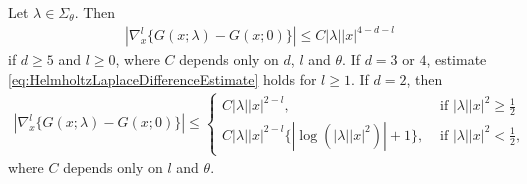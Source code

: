 \begin{lem}
  \label{lem:HelmholtzLaplaceDifference}
  Let $\lambda \in \Sigma_\theta$.
  Then
  \begin{align}
    \label{eq:HelmholtzLaplaceDifferenceEstimate}
    |\nabla_x^l \{ G(x; \lambda) - G(x; 0) \}| \leq C |\lambda| |x|^{4 - d - l}
  \end{align}
  if $d \geq 5$ and $l \geq 0$, where $C$ depends only on $d$, $l$ and $\theta$.
  If $d = 3$ or $4$, estimate \eqref{eq:HelmholtzLaplaceDifferenceEstimate} holds for $l \geq 1$.
  If $d = 2$, then
  \begin{align}
    \label{eq:HelmholtzLaplaceDifferenceEstimate2d}
    |\nabla_x^l \{ G(x; \lambda) - G(x; 0) \}| \leq 
    \begin{cases} 
      C |\lambda| |x|^{2 - l}, &\text{ if } |\lambda||x|^2 \geq \frac{1}{2} \\  
      C |\lambda||x|^{2 - l} \{ |\log( |\lambda| |x|^2)| + 1  \}, &\text{ if } |\lambda| |x|^2 < \frac{1}{2},
    \end{cases}
  \end{align}
  where $C$ depends only on $l$ and $\theta$.
\end{lem}

